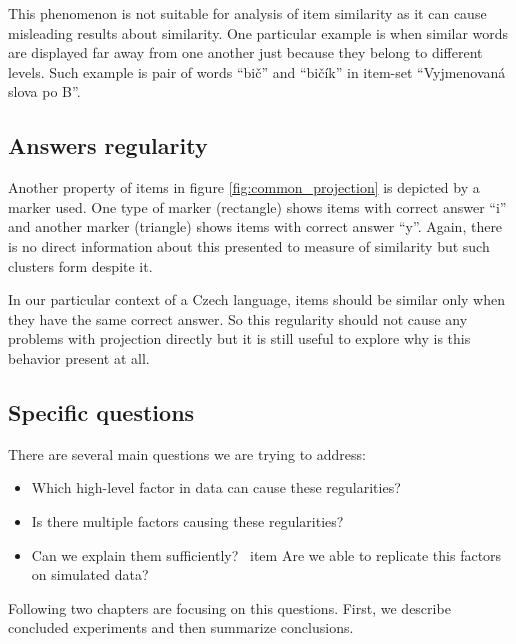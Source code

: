 \documentclass[
  digital, %
  table,   %
  nolof,     %
  nolot,     %
  nocover,
  color,
  final, %
]{fithesis3}
\begin{document}

This phenomenon is not suitable for analysis of item similarity as it can cause misleading results about similarity. One particular example is when similar words are displayed far away from one another just because they belong to different levels. Such example is pair of words ``bič'' and ``bičík'' in item-set ``Vyjmenovaná slova po B''.


\subsection{Answers regularity}\label{answers-regularity}

Another property of items in figure \ref{fig:common_projection} is depicted by a marker used. One type of marker (rectangle) shows items with correct answer ``i'' and another marker (triangle) shows items with correct answer ``y''. Again, there is no direct information about this presented to measure of similarity but such clusters form despite it.

In our particular context of a Czech language, items should be similar only when they have the same correct answer. So this regularity should not cause any problems with projection directly but it is still useful to explore why is this behavior present at all.


\subsection{Specific questions}\label{specific-questions}

There are several main questions we are trying to address:

\begin{itemize}
 \item Which high-level factor in data can cause these regularities?
 \item Is there multiple factors causing these regularities?
 \item Can we explain them sufficiently?
 \ item Are we able to replicate this factors on simulated data?
\end{itemize}


Following two chapters are focusing on this questions. First, we describe concluded experiments and then summarize conclusions.
\end{document}
